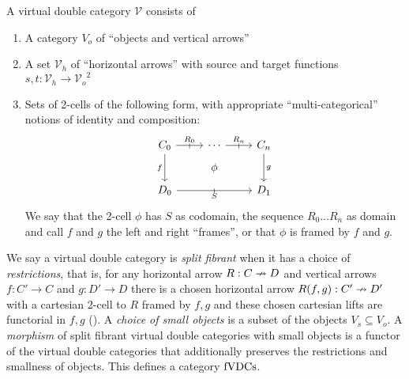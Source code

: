 \documentclass{llncs}
\begin{document}
\begin{definition}
  A virtual double category $\mathcal V$ consists of
  \begin{enumerate}
  \item A category $V_o$ of ``objects and vertical arrows''
  \item A set ${\mathcal V}_h$ of ``horizontal arrows'' with source
    and target functions $s,t : {\mathcal V}_h \to {\mathcal V_o}^2$
  \item Sets of 2-cells of the following form, 
    with appropriate ``multi-categorical'' notions of identity and
    composition:
\[\begin{tikzcd}[row sep=tiny]%
	{C_0} & \cdots & {C_{n}} \\
	& \phi \\
	{D_0} && {D_1}
	\arrow["{R_n}", "\shortmid"{marking}, from=1-2, to=1-3]
	\arrow["f"', from=1-1, to=3-1]
	\arrow["g", from=1-3, to=3-3]
	\arrow["S"', "\shortmid"{marking}, from=3-1, to=3-3]
	\arrow["{R_0}", "\shortmid"{marking}, from=1-1, to=1-2]
\end{tikzcd}\]
    We say that the 2-cell $\phi$ has $S$ as codomain, the sequence
    $R_0 \ldots R_n$ as domain and call $f$ and $g$ the left and right
    ``frames'', or that $\phi$ is framed by $f$ and $g$.
  \end{enumerate}
  We say a virtual double category is \emph{split fibrant} when it has
  a choice of \emph{restrictions}, that is, for any horizontal arrow
  $R : C \nrightarrow D$ and vertical arrows $f : C' \to C$ and $g : D' \to D$
  there is a chosen horizontal arrow $R(f,g) : C' \nrightarrow D'$ with a
  cartesian 2-cell to $R$ framed by $f,g$ and these chosen cartesian
  lifts are functorial in $f,g$ (\cite{Shulman08}).  A \emph{choice of
  small objects} is a subset of the objects $V_s \subseteq V_o$.  A
  \emph{morphism} of split fibrant virtual double categories with
  small objects is a functor of the virtual double categories that
  additionally preserves the restrictions and smallness of objects.
  This defines a category $\textrm{fVDCs}$.
\end{definition}
\end{document}
